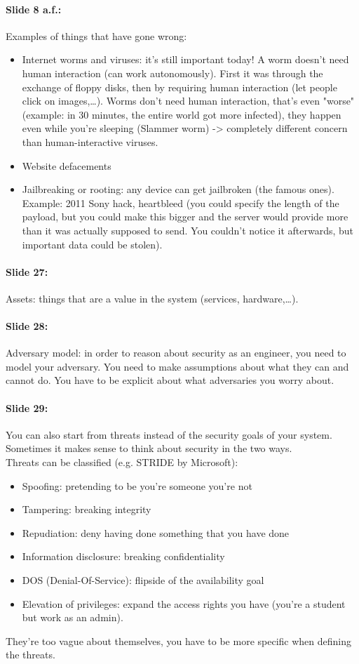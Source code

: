 \documentclass[10pt,a4paper]{report}
\begin{document}
\paragraph{Slide 8 a.f.:} Examples of things that have gone wrong:
\begin{itemize}
\item Internet worms and viruses: it's still important today! A worm doesn't need human interaction (can work autonomously). First it was through the exchange of floppy disks, then by requiring human interaction (let people click on images,…). Worms don't need human interaction, that's even "worse" (example: in 30 minutes, the entire world got more infected), they happen even while you're sleeping (Slammer worm) -> completely different concern than human-interactive viruses.
\item Website defacements
\item Jailbreaking or rooting: any device can get jailbroken (the famous ones). Example: 2011 Sony hack, heartbleed (you could specify the length of the payload, but you could make this bigger and the server would provide more than it was actually supposed to send. You couldn't notice it afterwards, but important data could be stolen).
\end{itemize}

\paragraph{Slide 27:}Assets: things that are a value in the system (services, hardware,…).

\paragraph{Slide 28:}Adversary model: in order to reason about security as an engineer, you need to model your adversary. You need to make assumptions about what they can and cannot do. You have to be explicit about what adversaries you worry about.

\paragraph{Slide 29:} You can also start from threats instead of the security goals of your system. Sometimes it makes sense to think about security in the two ways.\\
Threats can be classified (e.g. STRIDE by Microsoft):
\begin{itemize}
\item Spoofing: pretending to be you're someone you're not
\item Tampering: breaking integrity
\item Repudiation: deny having done something that you have done
\item Information disclosure: breaking confidentiality
\item DOS (Denial-Of-Service): flipside of the availability goal
\item Elevation of privileges: expand the access rights you have (you're a student but work as an admin).
\end{itemize}
They're too vague about themselves, you have to be more specific when defining the threats.
\end{document}

